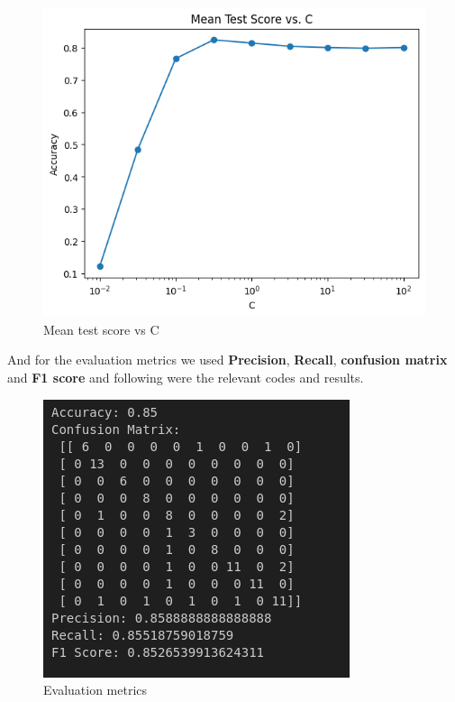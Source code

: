 \documentclass[11pt,a4paper]{article}
\begin{document}
\begin{figure}[h]
    \centering
    \includegraphics[width=1.0\linewidth]{images/4.png}
    \caption{Mean test score vs C}
\end{figure}

\newpage

And for the evaluation metrics we used \textbf{Precision}, \textbf{Recall}, \textbf{confusion matrix} and \textbf{F1 score} and following were the relevant codes and results.

\lstset{style=mystyle}


\begin{figure}[h]
    \centering
    \includegraphics[width=1.0\linewidth]{images/5.png}
    \caption{Evaluation metrics}
\end{figure}
\end{document}
